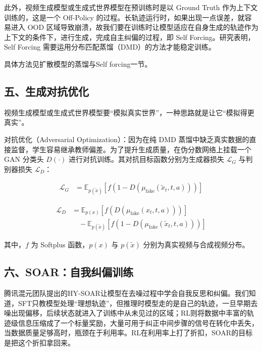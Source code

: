 此外，视频生成模型或生成式世界模型在预训练时是以 Ground Truth 作为上下文训练的，这是一个 Off-Policy 的过程。长轨迹运行时，如果出现一点误差，就容易进入 OOD 区域导致崩溃，故我们要在训练时让模型适应在自身生成的轨迹作为上下文的条件下，进行生成，完成自主纠偏的过程，即 Self Forcing。研究表明，Self Forcing 需要运用分布匹配蒸馏（DMD）的方法才能稳定训练。

具体方法见扩散模型的蒸馏与Self forcing一节。

\hypertarget{ux4e94ux751fux6210ux5bf9ux6297ux4f18ux5316}{%
\subsection{五、生成对抗优化}\label{ux4e94ux751fux6210ux5bf9ux6297ux4f18ux5316}}

视频生成模型或生成式世界模型要``模拟真实世界''，一种思路就是让它``模拟得更真实''。

对抗优化（Adversarial Optimization）：因为在纯 DMD 蒸馏中缺乏真实数据的直接监督，学生容易继承教师偏差。为了提升生成质量，在伪分数网络上挂载一个 GAN 分类头 \(D(\cdot)\) 进行对抗训练。其对抗目标函数分别为生成器损失 \(\mathcal{L}_G\) 与判别器损失 \(\mathcal{L}_D\)：

\[
\begin{aligned}
\mathcal{L}_G
&=
\mathbb{E}_{p(\tilde{x})}
\left[
f\left(1-D(\mu_{\mathrm{fake}}(\tilde{x}_t,t,a))\right)
\right]
\end{aligned}
\]

\[
\begin{aligned}
\mathcal{L}_D
&=
\mathbb{E}_{p(x)}
\left[
f\left(D(\mu_{\mathrm{fake}}(x_t,t,a))\right)
\right]
\\
&\quad -
\mathbb{E}_{p(\tilde{x})}
\left[
f\left(1-D(\mu_{\mathrm{fake}}(\tilde{x}_t,t,a))\right)
\right]
\end{aligned}
\]

其中，\(f\) 为 Softplus 函数，\(p(x)\) 与 \(p(\tilde{x})\) 分别为真实视频与合成视频分布。

\hypertarget{ux516dsoarux81eaux6211ux7ea0ux504fux8badux7ec3}{%
\subsection{六、SOAR：自我纠偏训练}\label{ux516dsoarux81eaux6211ux7ea0ux504fux8badux7ec3}}

腾讯混元团队提出的HY-SOAR让模型在去噪过程中学会自我反思和纠偏。我们知道，SFT只教模型处理``理想轨迹''，但推理时模型走的是自己的轨迹，一旦早期去噪出现偏移，后续状态就进入了训练中从未见过的区域；RL则将数据中丰富的轨迹级信息压缩成了一个标量奖励，大量可用于纠正中间步骤的信号在转化中丢失，当数据质量足够高时，瓶颈在于利用率。RL在利用率上打了折扣，SOAR的目标是把这个折扣拿回来。

